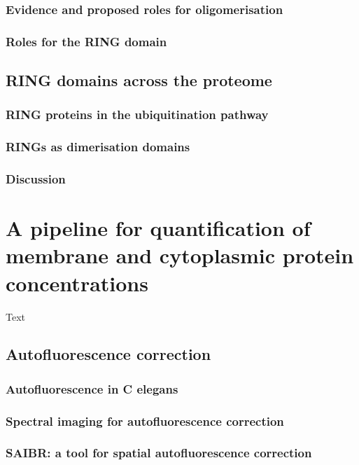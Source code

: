 \documentclass[11pt]{"article"}
\begin{document}
\subsubsection{Evidence and proposed roles for oligomerisation}
\subsubsection{Roles for the RING domain}

\clearpage
\subsection{RING domains across the proteome}
\subsubsection{RING proteins in the ubiquitination pathway}
\subsubsection{RINGs as dimerisation domains}
\subsubsection{Discussion}

\clearpage
\section{A pipeline for quantification of membrane and cytoplasmic protein concentrations}

Text

\subsection{Autofluorescence correction}
\subsubsection{Autofluorescence in C elegans}
\subsubsection{Spectral imaging for autofluorescence correction}
\subsubsection{SAIBR: a tool for spatial autofluorescence correction}
\end{document}
